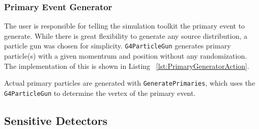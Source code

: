 \subsubsection{Primary Event Generator}

The user is responsible for telling the simulation toolkit the primary event to generate.
While there is great flexibility to generate any source distribution, a particle gun was chosen for simplicity.
\verb+G4ParticleGun+ generates primary particle(s) with a given momentrum and position without any randomization.
The implementation of this is shown in Listing ~\ref{lst:PrimaryGeneratorAction}.

Actual primary particles are generated with \verb+GeneratePrimaries+, which uses the \verb+G4ParticleGun+ to determine the vertex of the primary event.


\subsection{Sensitive Detectors}

